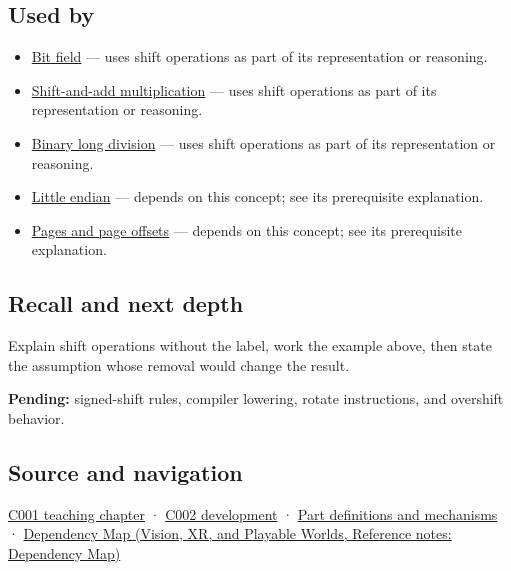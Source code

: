 \subsection{Used by}\label{appendix-73425b25118e-used-by}

\hypertarget{appendix-73425b25118e-used-by}{}

\begin{itemize}
\item
  \hyperref[appendix-ac697f5c66e8]{Bit field} --- uses shift operations as part of its representation or reasoning.
\item
  \hyperref[appendix-a65290d66ed9]{Shift-and-add multiplication} --- uses shift operations as part of its representation or reasoning.
\item
  \hyperref[appendix-89985e6a2685]{Binary long division} --- uses shift operations as part of its representation or reasoning.
\item
  \hyperref[appendix-367b6abf460e]{Little endian} --- depends on this concept; see its prerequisite explanation.
\item
  \hyperref[appendix-0c67cd5bf30a]{Pages and page offsets} --- depends on this concept; see its prerequisite explanation.
\end{itemize}

\subsection{Recall and next depth}\label{appendix-73425b25118e-recall-and-next-depth}

\hypertarget{appendix-73425b25118e-recall-and-next-depth}{}

Explain shift operations without the label, work the example above, then state the assumption whose removal would change the result.

\textbf{Pending:} signed-shift rules, compiler lowering, rotate instructions, and overshift behavior.

\subsection{Source and navigation}\label{appendix-73425b25118e-source-and-navigation}

\hypertarget{appendix-73425b25118e-source-and-navigation}{}

\hyperref[01-foundations-i-ch001-from-a-signal-to-an-interpretation]{C001 teaching chapter} · \hyperref[01-foundations-i-ch001-arithmetic-becomes-a-policy]{C002 development} · \hyperref[appendix-fd090d982a15]{Part definitions and mechanisms} · \href{../07-Vision-XR-and-Playable-Worlds/main.pdf\#nameddest=appendix-4ad47bdd269a}{Dependency Map (Vision, XR, and Playable Worlds, Reference notes: Dependency Map)}
